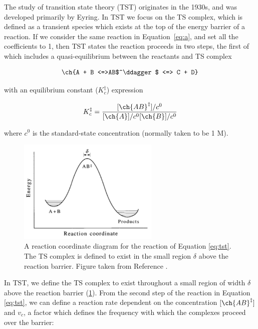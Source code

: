 The study of transition state theory (TST) originates in the 1930s, and was developed primarily by Eyring.\cite{McQuarrie1997,Steinfeld1998} In TST we focus on the TS complex, which is defined as a transient species which exists at the top of the energy barrier of a reaction. If we consider the same reaction in Equation~\ref{eq:a}, and set all the coefficients to 1, then TST states the reaction proceeds in two steps, the first of which includes a quasi-equilibrium between the reactants and TS complex

\begin{equation}
  \ch{A + B <=>AB$^\ddagger$ <=> C + D}
  \label{eq:tst}
\end{equation}

\noindent with an equilibrium constant ($K_c^{\ddagger}$) expression

\begin{equation}
  K_c^{\ddagger} = \frac{[\ch{AB}^\ddagger]/c^0}{[\ch{A}]/c^0[\ch{B}]/c^0}
\label{eq:K}
\end{equation}

\noindent where $c^0$ is the standard-state concentration (normally taken to be 1 M).

\begin{figure}[htb]
    \centering
    \includegraphics[width=0.6\textwidth]{figures/TST-PES.png}
    \caption[A reaction coordinate diagram for a generic reaction.]{A reaction
      coordinate diagram for the reaction of Equation \ref{eq:tst}. The TS complex is
      defined to exist in the small region $\delta$ above the reaction
      barrier. Figure taken from Reference {\protect{}}.}
    \label{fig:tst-pes}
\end{figure}

In TST, we define the TS complex to exist throughout a small region of width $\delta$ above the reaction barrier (\ref{fig:tst-pes}). From the second step of the reaction in Equation \ref{eq:tst}, we can define a reaction rate dependent on the concentration $[\ch{AB}^\ddagger]$ and $v_c$, a factor which defines the frequency with which the complexes proceed over the barrier:

